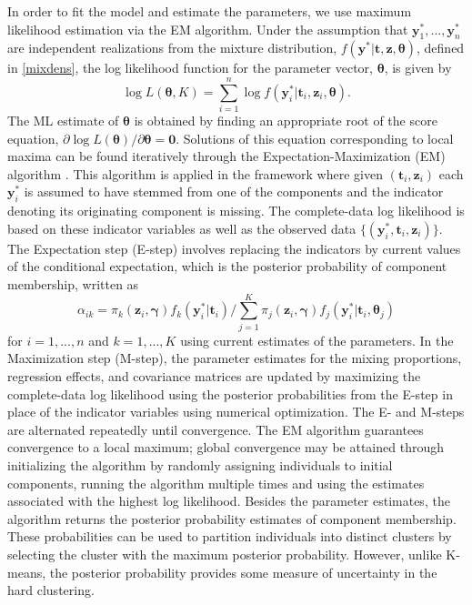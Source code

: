 \documentclass[12pt]{article}
\newcommand{\B}[0]{\mathbf}
\newcommand{\bs}[0]{\boldsymbol}
\begin{document}
In order to fit the model and estimate the parameters, we use maximum likelihood estimation via the EM algorithm. Under the assumption that $\B y^{*}_{1},...,\B y^{*}_{n}$ are independent realizations from the mixture distribution, $f(\B y^{*} | \B t, \B z, \bs\theta)$, defined in \ref{mixdens}, the log likelihood function for the parameter vector, $\bs \theta$, is given by
$$\log L(\bs\theta,K)=\sum^{n}_{i=1}\log f(\B y^{*}_{i}|\B t_{i},\B z_{i},\bs \theta).$$
The ML estimate of $\bs\theta$ is obtained by finding an appropriate root of the score equation, $\partial \log L(\bs\theta)/\partial \bs\theta=\B 0.$ Solutions of this equation corresponding to local maxima can be found iteratively through the Expectation-Maximization (EM) algorithm \cite{dempster1977}. This algorithm is applied in the framework where given $(\B t_{i},\B z_{i})$ each $\B y^{*}_{i}$ is assumed to have stemmed from one of the components and the indicator denoting its originating component is missing. The complete-data log likelihood is based on these indicator variables as well as the observed data $\{(\B y^{*}_{i}, \B t_{i}, \B z_{i})\}$. The Expectation step (E-step) involves replacing the indicators by current values of the conditional expectation, which is the posterior probability of component membership, written as
$$\alpha_{ik}=\pi_{k}(\B z_{i},\bs\gamma)f_{k}(\B y^{*}_{i}|\B t_{i})/\sum_{j=1}^{K}\pi_{j}(\B z_{i},\bs\gamma)f_{j}(\B y^{*}_{i}|\B t_{i},\bs \theta_{j})$$
for $i=1,...,n$ and $k=1,...,K$ using current estimates of the parameters. In the Maximization step (M-step), the parameter estimates for the mixing proportions, regression effects, and covariance matrices are updated by maximizing the complete-data log likelihood using the posterior probabilities from the E-step in place of the indicator variables using numerical optimization. The E- and M-steps are alternated repeatedly until convergence. The EM algorithm guarantees convergence to a local maximum; global convergence may be attained through initializing the algorithm by randomly assigning individuals to initial components, running the algorithm multiple times and using the estimates associated with the highest log likelihood. Besides the parameter estimates, the algorithm returns the posterior probability estimates of component membership. These probabilities can be used to partition individuals into distinct clusters by selecting the cluster with the maximum posterior probability. However, unlike K-means, the posterior probability provides some measure of uncertainty in the hard clustering. 
\end{document}
